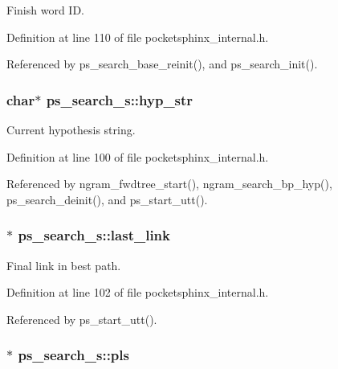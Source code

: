Finish word I\-D. 



Definition at line 110 of file pocketsphinx\-\_\-internal.\-h.



Referenced by ps\-\_\-search\-\_\-base\-\_\-reinit(), and ps\-\_\-search\-\_\-init().

\subsubsection[{hyp\-\_\-str}]{\setlength{\rightskip}{0pt plus 5cm}char$\ast$ ps\-\_\-search\-\_\-s\-::hyp\-\_\-str}\label{structps__search__s_aa398c736a887af97e42b2a562359adc3}


Current hypothesis string. 



Definition at line 100 of file pocketsphinx\-\_\-internal.\-h.



Referenced by ngram\-\_\-fwdtree\-\_\-start(), ngram\-\_\-search\-\_\-bp\-\_\-hyp(), ps\-\_\-search\-\_\-deinit(), and ps\-\_\-start\-\_\-utt().

\subsubsection[{last\-\_\-link}]{$\ast$ ps\-\_\-search\-\_\-s\-::last\-\_\-link}\label{structps__search__s_aa3020ef7bd4e56713dfe2fbad52e6e4f}


Final link in best path. 



Definition at line 102 of file pocketsphinx\-\_\-internal.\-h.



Referenced by ps\-\_\-start\-\_\-utt().

\subsubsection[{pls}]{$\ast$ ps\-\_\-search\-\_\-s\-::pls}\label{structps__search__s_a2a33b7698fb237b42e007788f65cd46c}


